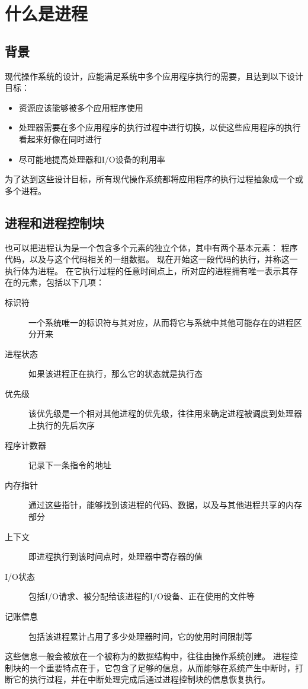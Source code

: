 
\section{什么是进程}
{
    \subsection{背景}
    {
        现代操作系统的设计，应能满足系统中多个应用程序执行的需要，且达到以下设计目标：

        \begin{itemize}
            \item 资源应该能够被多个应用程序使用
            \item 处理器需要在多个应用程序的执行过程中进行切换，以使这些应用程序的执行看起来好像在同时进行
            \item 尽可能地提高处理器和I/O设备的利用率
        \end{itemize}

        为了达到这些设计目标，所有现代操作系统都将应用程序的执行过程抽象成一个或多个进程。
    }

    \subsection{进程和进程控制块}
    {
        也可以把进程认为是一个包含多个元素的独立个体，其中有两个基本元素：
        程序代码，以及与这个代码相关的一组数据。
        现在开始这一段代码的执行，并称这一执行体为进程。
        在它执行过程的任意时间点上，所对应的进程拥有唯一表示其存在的元素，包括以下几项：

        \begin{description}
            \item[标识符] 一个系统唯一的标识符与其对应，从而将它与系统中其他可能存在的进程区分开来
            \item[进程状态] 如果该进程正在执行，那么它的状态就是执行态
            \item[优先级] 该优先级是一个相对其他进程的优先级，往往用来确定进程被调度到处理器上执行的先后次序
            \item[程序计数器] 记录下一条指令的地址
            \item[内存指针] 通过这些指针，能够找到该进程的代码、数据，以及与其他进程共享的内存部分
            \item[上下文]  即进程执行到该时间点时，处理器中寄存器的值
            \item[I/O状态] 包括I/O请求、被分配给该进程的I/O设备、正在使用的文件等
            \item[记账信息] 包括该进程累计占用了多少处理器时间，它的使用时间限制等
        \end{description}

        这些信息一般会被放在一个被称为的数据结构中，往往由操作系统创建。
        进程控制块的一个重要特点在于，它包含了足够的信息，从而能够在系统产生中断时，打断它的执行过程，并在中断处理完成后通过进程控制块的信息恢复执行。
    }
}
